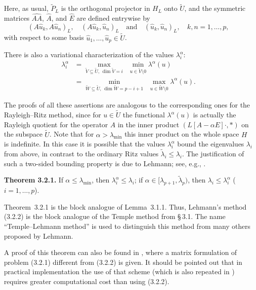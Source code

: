 \documentclass[11pt,oneside]{book}
\begin{document}
Here, as usual, $\widetilde{P}_L$ is the orthogonal projector in $H_L$ onto $\widetilde{U}$, and the symmetric matrices $\widehat{AA}$, $\widehat{A}$, and $\widehat{E}$ are defined entrywise by
\[
(A\hat{u}_k, A\hat{u}_n)_L, \quad (A\hat{u}_k, \hat{u}_n)_L \quad \text{and} \quad (\hat{u}_k, \hat{u}_n)_L, \quad k, n = 1, \ldots, p,
\]
with respect to some basis $\hat{u}_1, \ldots, \hat{u}_p \in \widetilde{U}$.

There is also a variational characterization of the values $\lambda_i^\alpha$:
\[
\begin{aligned}
\lambda_i^\alpha &= \max_{\widetilde{V} \subseteq \widetilde{U},\, \dim \widetilde{V} = i} \;\, \min_{u \in \widetilde{V} \setminus 0} \lambda^\alpha(u) \\
&= \min_{\widetilde{W} \subseteq \widetilde{U},\, \dim \widetilde{W} = p - i + 1} \;\, \max_{u \in \widetilde{W} \setminus 0} \lambda^\alpha(u).
\end{aligned}
\tag{3.2.3}
\]

The proofs of all these assertions are analogous to the corresponding ones for the Rayleigh--Ritz method, since for $u \in \widetilde{U}$ the functional $\lambda^\alpha(u)$ is actually the Rayleigh quotient for the operator $A$ in the inner product $(L[A - \alpha E]\cdot, *)$ on the subspace $\widetilde{U}$. Note that for $\alpha > \lambda_{\min}$ this inner product on the whole space $H$ is
indefinite. In this case it is possible that the values $\lambda_i^\alpha$ bound the eigenvalues $\lambda_i$ from above, in contrast to the ordinary Ritz values $\tilde{\lambda}_i \leqslant \lambda_i$. The justification of such a two-sided bounding property is due to Lehmann; see, e.g., \citep{Lehmann1949a,GoerischAlbrecht1984a}.

\textbf{Theorem 3.2.1.} If $\alpha \leqslant \lambda_{\min}$, then $\lambda_i^\alpha \leqslant \lambda_i$; if $\alpha \in [\lambda_{p+1}, \tilde{\lambda}_p)$, then $\lambda_i \leqslant \lambda_i^\alpha$ ($i = 1, \ldots, p$).

Theorem~3.2.1 is the block analogue of Lemma~3.1.1. Thus, Lehmann's method (3.2.2) is the block analogue of the Temple method %
from \S\,3.1. The name ``Temple--Lehmann method'' is used to distinguish this method from many others proposed by Lehmann.

A proof of this theorem can also be found in \citep[pp.~226--227]{Parlett1983}, where a matrix formulation of problem (3.2.1) different from (3.2.2) is given. It should be pointed out that in practical implementation the use of that scheme (which is also repeated in \citep[pp.~145--146]{VoevodinKuznetsov1984}) requires greater computational cost than using (3.2.2).
\end{document}
